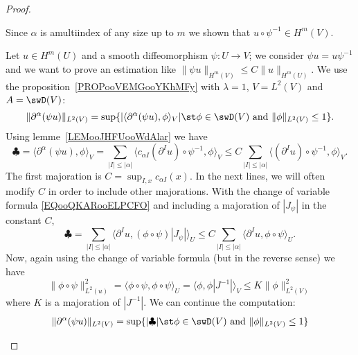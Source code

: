 \begin{proof}
\begin{subproof}
        Since \( \alpha\) is  amultiindex of any size up to \( m\) we shown that \( u\circ\psi^{-1}\in H^m(V)\).



            Let \( u\in H^m(U)\) and a smooth diffeomorphism \( \psi\colon U\to V\); we consider \( \psi u=u\psi^{-1}\) and we want to prove an estimation like \( \| \psi u \|_{H^m(V)}\leq C\| u \|_{H^m(U)}\). We use the proposition~\ref{PROPooVEMGooYKhMFy} with \( \lambda=1\), \( V=L^2(V)\) and \( A=\swD(V)\):
            \begin{equation}
                \| \partial^{\alpha}(\psi u) \|_{L^2(V)}=\sup\{ | \langle \partial^{\alpha}(\psi u), \phi\rangle_V |\st \phi\in\swD(V)\text{ and }\| \phi \|_{L^2(V)}\leq 1 \}.
            \end{equation}
            Using lemme~\ref{LEMooJHFUooWdAlar} we have
            \begin{equation}
                \clubsuit=\langle \partial^{\alpha}(\psi u), \phi\rangle_V=\sum_{| I |\leq | \alpha |}\langle c_{\alpha I}(\partial^Iu)\circ\psi^{-1}, \phi\rangle_V\leq C\sum_{| I |\leq | \alpha |}\langle (\partial^Iu)\circ \psi^{-1}, \phi\rangle_V.
            \end{equation}
            The first majoration is \( C=\sup_{I,x}c_{\alpha I}(x)\). In the next lines, we will often modify \( C\) in order to include other majorations. With the change of variable formula \eqref{EQooQKARooELPCFO} and including a majoration of \( | J_{\psi} |\) in the constant \( C\),
            \begin{equation}
                \clubsuit=\sum_{| I |\leq | \alpha |}\langle \partial^Iu, (\phi\circ\psi)| J_{\psi} |\rangle_U\leq C\sum_{| I |\leq | \alpha |}\langle \partial^Iu, \phi\circ\psi\rangle_U.
            \end{equation}
            Now, again using the change of variable formula (but in the reverse sense) we have
            \begin{equation}
                \| \phi\circ\psi \|^2_{L^2(u)}=\langle \phi\circ\psi, \phi\circ\psi\rangle_U=\langle \phi, \phi| J^{-1} |\rangle_V\leq K\| \phi \|^2_{L^2(V)}
            \end{equation}
            where \( K\) is a majoration of \( | J^{-1} |\). We can continue the computation:
            \begin{subequations}
                \begin{align}
                    \| \partial^{\alpha}(\psi u) \|_{L^2(V)}&=\sup\{ | \clubsuit |\st \phi\in\swD(V)\text{ and }\| \phi \|_{L^2(V)}\leq 1 \}\\

\end{align}
\end{subequations}
\end{subproof}
\end{proof}

